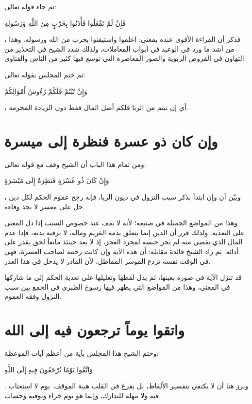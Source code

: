 ثم جاء قوله تعالى: \begin{ayah}فَإِنْ لَمْ تَفْعَلُوا فَأْذَنُوا بِحَرْبٍ مِنَ اللَّهِ وَرَسُولِهِ\end{ayah}، فذكر  أن القراءة الأقوى عنده بمعنى: اعلموا واستيقنوا بحرب من الله ورسوله. وهذا من أشد ما ورد في الوعيد في أبواب المعاملات، ولذلك شدد الشيخ في التحذير من التهاون في القروض الربوية والصور المعاصرة التي توسع فيها كثير من الناس والفتاوى.

ثم ختم المجلس بقوله تعالى: \begin{ayah}وَإِنْ تُبْتُمْ فَلَكُمْ رُءُوسُ أَمْوَالِكُمْ\end{ayah}، أي إن تبتم من الربا فلكم أصل المال فقط دون الزيادة المحرمة.

\section{وإن كان ذو عسرة فنظرة إلى ميسرة}
ومن تمام هذا الباب أن الشيخ وقف مع قوله تعالى: \begin{ayah}وَإِنْ كَانَ ذُو عُسْرَةٍ فَنَظِرَةٌ إِلَى مَيْسَرَةٍ\end{ayah}، وبيّن أن  وإن ابتدأ بذكر سبب النزول في ديون الربا، فإنه رجح عموم الحكم لكل دين حل على معسر لا يجد وفاءه.

وهذا من المواضع الجميلة في صنيعه؛ لأنه لا يقف عند خصوص السبب إذا دل المعنى على التعدية. ولذلك قرر أن الدين إنما يتعلق بذمة الغريم وماله، لا برقبة بدنه، فإذا عدم المال الذي يقضي منه لم يجز حبسه لمجرد العجز، إذ لا يعد حينئذ مانعاً لحق يقدر على أدائه. ثم زاد الشيخ فائدة مقابلة: أن هذه الآية وإن كانت رحمة لصاحب العسرة، فهي في الوقت نفسه تردع الموسر المماطل، لأن القادر لا يدخل في هذا العذر.

\begin{fawaid}
قد تنزل الآية في صورة بعينها، ثم يدل لفظها وتعليلها على تعدية الحكم إلى ما شاركها في المعنى، وهذا من المواضع التي يظهر فيها رسوخ الطبري في الجمع بين سبب النزول وفقه العموم.
\end{fawaid}

\section{واتقوا يوماً ترجعون فيه إلى الله}
وختم الشيخ هذا المجلس بآية من أعظم آيات الموعظة: \begin{ayah}وَاتَّقُوا يَوْمًا تُرْجَعُونَ فِيهِ إِلَى اللَّهِ\end{ayah}. وبرز هنا أن  لا يكتفي بتفسير الألفاظ، بل يفرغ في القلب هيبة الموقف: يوم لا استعتاب فيه ولا مهلة للتدارك، وإنما هو يوم جزاء وتوفية وحساب.

